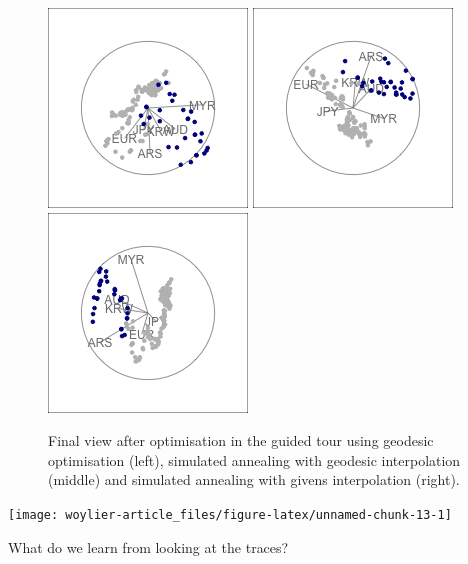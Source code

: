 \begin{Schunk}
\begin{figure}

{\centering \includegraphics[width=0.3\linewidth]{rates_tour_geodesic_final} \includegraphics[width=0.3\linewidth]{rates_tour_better_final} \includegraphics[width=0.3\linewidth]{rates_tour_givens_final} 

}

\caption[Final view after optimisation in the guided tour using geodesic optimisation (left), simulated annealing with geodesic interpolation (middle) and simulated annealing with givens interpolation (right)]{Final view after optimisation in the guided tour using geodesic optimisation (left), simulated annealing with geodesic interpolation (middle) and simulated annealing with givens interpolation (right).}\label{fig:rates-tour-static}
\end{figure}
\end{Schunk}

\begin{Schunk}

\texttt{[image: woylier-article\_files/figure-latex/unnamed-chunk-13-1]} \end{Schunk}

What do we learn from looking at the traces?


